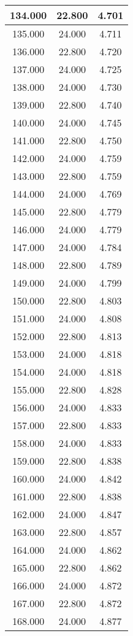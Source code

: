\documentclass[11pt,a4paper]{jsarticle}
\begin{document}
\begin{center}
\begin{longtable}{|c|c|c|}
134.000	 & 22.800&  4.701 \\ \hline
135.000	 & 24.000&  4.711 \\ \hline
136.000	 & 22.800&  4.720 \\ \hline
137.000	 & 24.000&  4.725 \\ \hline
138.000	 & 24.000&  4.730 \\ \hline
139.000	 & 22.800&  4.740 \\ \hline
140.000	 & 24.000&  4.745 \\ \hline
141.000	 & 22.800&  4.750 \\ \hline
142.000	 & 24.000&  4.759 \\ \hline
143.000	 & 22.800&  4.759 \\ \hline
144.000	 & 24.000&  4.769 \\ \hline
145.000	 & 22.800&  4.779 \\ \hline
146.000	 & 24.000&  4.779 \\ \hline
147.000	 & 24.000&  4.784 \\ \hline
148.000	 & 22.800&  4.789 \\ \hline
149.000	 & 24.000&  4.799 \\ \hline
150.000	 & 22.800&  4.803 \\ \hline
151.000	 & 24.000&  4.808 \\ \hline
152.000	 & 22.800&  4.813 \\ \hline
153.000	 & 24.000&  4.818 \\ \hline
154.000	 & 24.000&  4.818 \\ \hline
155.000	 & 22.800&  4.828 \\ \hline
156.000	 & 24.000&  4.833 \\ \hline
157.000	 & 22.800&  4.833 \\ \hline
158.000	 & 24.000&  4.833 \\ \hline
159.000	 & 22.800&  4.838 \\ \hline
160.000	 & 24.000&  4.842 \\ \hline
161.000	 & 22.800&  4.838 \\ \hline
162.000	 & 24.000&  4.847 \\ \hline
163.000	 & 22.800&  4.857 \\ \hline
164.000	 & 24.000&  4.862 \\ \hline
165.000	 & 22.800&  4.862 \\ \hline
166.000	 & 24.000&  4.872 \\ \hline
167.000	 & 22.800&  4.872 \\ \hline
168.000	 & 24.000&  4.877 \\ \hline

\end{longtable}
\end{center}
\end{document}
